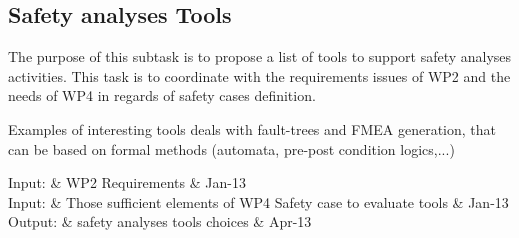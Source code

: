 \documentclass{template/openetcs_article}
\begin{document}
%
% 
%

\subsection{Safety analyses Tools}


The purpose of this subtask is to propose a list of tools to  support  safety  analyses activities. This task  is to  coordinate with  the requirements issues of WP2 and the needs of WP4 in regards of safety cases definition.

Examples of interesting tools deals with fault-trees and FMEA generation, that can be based on formal methods (automata, pre-post condition logics,...) 
  
 
\begin{inoutput}
Input: & WP2 Requirements & Jan-13 \\
Input: & Those sufficient elements of WP4 Safety case to evaluate tools & Jan-13 \\
\hline
Output: & safety analyses tools choices & Apr-13 \\
\end{inoutput}



\end{document}
